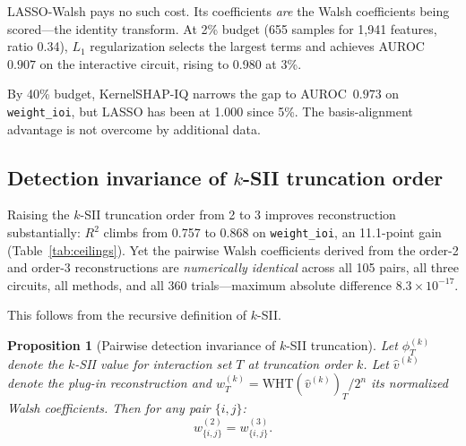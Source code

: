 \documentclass[10pt]{article}
\newtheorem{proposition}{Proposition}
\begin{document}
LASSO-Walsh pays no such cost. Its coefficients \emph{are} the Walsh
coefficients being scored---the identity transform. At 2\% budget
(655 samples for 1{,}941 features, ratio 0.34), $L_1$ regularization
selects the largest terms and achieves AUROC~$0.907$ on the
interactive circuit, rising to 0.980 at 3\%.

By 40\% budget, KernelSHAP-IQ narrows the gap to AUROC~$0.973$
on \texttt{weight\_ioi}, but LASSO has been at 1.000 since 5\%.
The basis-alignment advantage is not overcome by additional data.


\subsection{Detection invariance of $k$-SII truncation order}
\label{sec:invariance}

Raising the $k$-SII truncation order from 2 to 3 improves
reconstruction substantially: $R^2$ climbs from 0.757 to 0.868 on
\texttt{weight\_ioi}, an 11.1-point gain (Table~\ref{tab:ceilings}).
Yet the pairwise Walsh coefficients derived from the order-2 and
order-3 reconstructions are \emph{numerically identical} across all
105 pairs, all three circuits, all methods, and all 360
trials---maximum absolute difference $8.3 \times 10^{-17}$.

This follows from the recursive definition of $k$-SII.

\begin{proposition}[Pairwise detection invariance of $k$-SII truncation]
\label{prop:invariance}
Let $\phi^{(k)}_T$ denote the $k$-SII value for interaction set $T$
at truncation order $k$. Let $\hat{v}^{(k)}$ denote the plug-in
reconstruction and $w^{(k)}_T = \text{WHT}(\hat{v}^{(k)})_T / 2^n$
its normalized Walsh coefficients. Then for any pair $\{i,j\}$:
\[
  w^{(2)}_{\{i,j\}} = w^{(3)}_{\{i,j\}}.
\]
\end{proposition}
\end{document}
